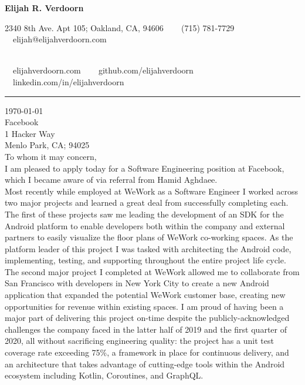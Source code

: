 \documentclass[9pt,letterpaper]{article}
\newcommand{\company}{Facebook}
\newcommand{\referral}{referral from Hamid Aghdaee}
\newcommand{\companyHeader}{Facebook \\ 1 Hacker Way \\ Menlo Park, CA; 94025}
\begin{document}
\begin{center}
{\LARGE \textbf{Elijah R. Verdoorn}}

2340 8th Ave. Apt 105; Oakland, CA, 94606 \ \textbullet
\ \ (715) 781-7729\ \ \textbullet
\ \ elijah@elijahverdoorn.com

\\
\ \ elijahverdoorn.com \ \textbullet
\ \ github.com/elijahverdoorn \ \textbullet
\ \ linkedin.com/in/elijahverdoorn
\end{center}

\hrule
\vspace{1em}

\noindent\today
\\

\noindent\companyHeader
\\

\noindent To whom it may concern, \\

\noindent I am pleased to apply today for a Software Engineering position at \company, which I became aware of via \referral. \\

\noindent Most recently while employed at WeWork as a Software Engineer I worked across two major projects and learned a great deal from successfully completing each. The first of these projects saw me leading the development of an SDK for the Android platform to enable developers both within the company and external partners to easily visualize the floor plans of WeWork co-working spaces. As the platform leader of this project I was tasked with architecting the Android code, implementing, testing, and supporting throughout the entire project life cycle. The second major project I completed at WeWork allowed me to collaborate from San Francisco with developers in New York City to create a new Android application that expanded the potential WeWork customer base, creating new opportunities for revenue within existing spaces.  I am proud of having been a major part of delivering this project on-time despite the publicly-acknowledged challenges the company faced in the latter half of 2019 and the first quarter of 2020, all without sacrificing engineering quality: the project has a unit test coverage rate exceeding 75\%, a framework in place for continuous delivery, and an architecture that takes advantage of cutting-edge tools within the Android ecosystem including Kotlin, Coroutines, and GraphQL.\\
\end{document}

